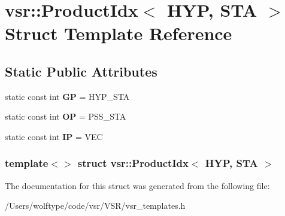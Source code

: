 \hypertarget{structvsr_1_1_product_idx_3_01_h_y_p_00_01_s_t_a_01_4}{\section{vsr\-:\-:Product\-Idx$<$ H\-Y\-P, S\-T\-A $>$ Struct Template Reference}
\label{structvsr_1_1_product_idx_3_01_h_y_p_00_01_s_t_a_01_4}
}
\subsection*{Static Public Attributes}
\begin{DoxyCompactItemize}
\item 
\hypertarget{structvsr_1_1_product_idx_3_01_h_y_p_00_01_s_t_a_01_4_ad865bdc6f65a9dd1c56f7baa1ebe5e70}{static const int {\bfseries G\-P} = H\-Y\-P\-\_\-\-S\-T\-A}\label{structvsr_1_1_product_idx_3_01_h_y_p_00_01_s_t_a_01_4_ad865bdc6f65a9dd1c56f7baa1ebe5e70}

\item 
\hypertarget{structvsr_1_1_product_idx_3_01_h_y_p_00_01_s_t_a_01_4_aca998de5ff7eb494b7fefd3f140f3d31}{static const int {\bfseries O\-P} = P\-S\-S\-\_\-\-S\-T\-A}\label{structvsr_1_1_product_idx_3_01_h_y_p_00_01_s_t_a_01_4_aca998de5ff7eb494b7fefd3f140f3d31}

\item 
\hypertarget{structvsr_1_1_product_idx_3_01_h_y_p_00_01_s_t_a_01_4_a39de66a8ce211ad119f322660913931f}{static const int {\bfseries I\-P} = V\-E\-C}\label{structvsr_1_1_product_idx_3_01_h_y_p_00_01_s_t_a_01_4_a39de66a8ce211ad119f322660913931f}

\end{DoxyCompactItemize}
\subsubsection*{template$<$$>$ struct vsr\-::\-Product\-Idx$<$ H\-Y\-P, S\-T\-A $>$}



The documentation for this struct was generated from the following file\-:\begin{DoxyCompactItemize}
\item 
/\-Users/wolftype/code/vsr/\-V\-S\-R/vsr\-\_\-templates.\-h\end{DoxyCompactItemize}
